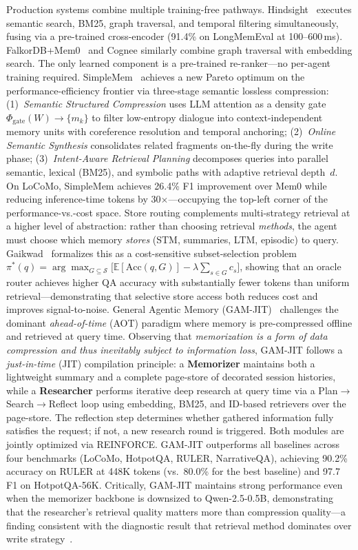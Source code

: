 \documentclass[hf]{ceurart}
\begin{document}
Production systems combine multiple training-free pathways.
Hindsight~\cite{hindsight2025} executes semantic search, BM25, graph
traversal, and temporal filtering simultaneously, fusing via a
pre-trained cross-encoder (91.4\% on LongMemEval at 100--600\,ms).
FalkorDB+Mem0~\cite{falkordb2025} and Cognee similarly combine graph
traversal with embedding search. The only learned component is a
pre-trained re-ranker---no per-agent training required.
SimpleMem~\cite{simplemem2026} achieves a new Pareto optimum on the
performance-efficiency frontier via three-stage semantic lossless
compression: (1)~\emph{Semantic Structured Compression} uses LLM
attention as a density gate $\Phi_{\text{gate}}(W) \to \{m_k\}$ to
filter low-entropy dialogue into context-independent memory units with
coreference resolution and temporal anchoring; (2)~\emph{Online Semantic
Synthesis} consolidates related fragments on-the-fly during the write
phase; (3)~\emph{Intent-Aware Retrieval Planning} decomposes queries
into parallel semantic, lexical (BM25), and symbolic paths with
adaptive retrieval depth~$d$. On LoCoMo, SimpleMem achieves 26.4\%
F1 improvement over Mem0 while reducing inference-time tokens by
30$\times$---occupying the top-left corner of the
performance-vs.-cost space.
Store routing complements multi-strategy retrieval at a higher level
of abstraction: rather than choosing retrieval \emph{methods},
the agent must choose which memory \emph{stores} (STM, summaries,
LTM, episodic) to query. Gaikwad~\cite{storerouting2026} formalizes
this as a cost-sensitive subset-selection problem $\pi^*(q) =
\arg\max_{G \subseteq \mathcal{S}} \bigl[\mathbb{E}[\text{Acc}(q,G)]
- \lambda \sum_{s \in G} c_s\bigr]$, showing that an oracle router
achieves higher QA accuracy with substantially fewer tokens than
uniform retrieval---demonstrating that selective store access both
reduces cost and improves signal-to-noise.
General Agentic Memory (GAM-JIT)~\cite{gamjit2025} challenges the
dominant \emph{ahead-of-time} (AOT) paradigm where memory is
pre-compressed offline and retrieved at query time. Observing that
\emph{memorization is a form of data compression and thus inevitably
subject to information loss}, GAM-JIT follows a \emph{just-in-time}
(JIT) compilation principle: a \textbf{Memorizer} maintains both a
lightweight summary and a complete page-store of decorated session
histories, while a \textbf{Researcher} performs iterative deep
research at query time via a Plan$\to$Search$\to$Reflect loop using
embedding, BM25, and ID-based retrievers over the page-store. The
reflection step determines whether gathered information fully satisfies
the request; if not, a new research round is triggered. Both modules
are jointly optimized via REINFORCE. GAM-JIT outperforms all baselines
across four benchmarks (LoCoMo, HotpotQA, RULER, NarrativeQA),
achieving 90.2\% accuracy on RULER at 448K tokens (vs.\ 80.0\% for the
best baseline) and 97.7 F1 on HotpotQA-56K. Critically, GAM-JIT
maintains strong performance even when the memorizer backbone is
downsized to Qwen-2.5-0.5B, demonstrating that the researcher's
retrieval quality matters more than compression quality---a finding
consistent with the diagnostic result that retrieval method dominates
over write strategy~\cite{diagnosebottleneck2026}.
\end{document}

